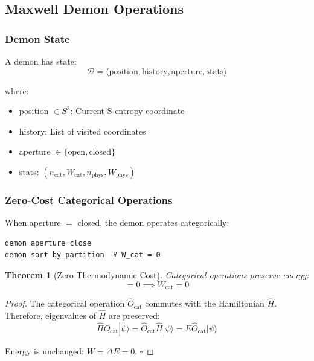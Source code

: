 \documentclass[twocolumn,10pt]{article}
\newtheorem{theorem}{Theorem}[section]
\theoremstyle{definition}
\theoremstyle{remark}
\begin{document}
\subsection{Maxwell Demon Operations}

\subsubsection{Demon State}

A demon has state:
\begin{equation}
    \mathcal{D} = \langle\text{position}, \text{history}, \text{aperture}, \text{stats}\rangle
\end{equation}

where:
\begin{itemize}
    \item position $\in S^3$: Current S-entropy coordinate
    \item history: List of visited coordinates
    \item aperture $\in \{\text{open}, \text{closed}\}$
    \item stats: $(n_{\text{cat}}, W_{\text{cat}}, n_{\text{phys}}, W_{\text{phys}})$
\end{itemize}

\subsubsection{Zero-Cost Categorical Operations}

When aperture $= $ closed, the demon operates categorically:
\begin{lstlisting}
demon aperture close
demon sort by partition  # W_cat = 0
\end{lstlisting}

\begin{theorem}[Zero Thermodynamic Cost]
Categorical operations preserve energy:
\begin{equation}
    [\hat{O}_{\text{cat}}, \hat{H}] = 0 \implies W_{\text{cat}} = 0
\end{equation}
\end{theorem}

\begin{proof}
The categorical operation $\hat{O}_{\text{cat}}$ commutes with the Hamiltonian $\hat{H}$. Therefore, eigenvalues of $\hat{H}$ are preserved:
\begin{equation}
    \hat{H}\hat{O}_{\text{cat}}|\psi\rangle = \hat{O}_{\text{cat}}\hat{H}|\psi\rangle = E \hat{O}_{\text{cat}}|\psi\rangle
\end{equation}

Energy is unchanged: $W = \Delta E = 0$. $\square$
\end{proof}
\end{document}
